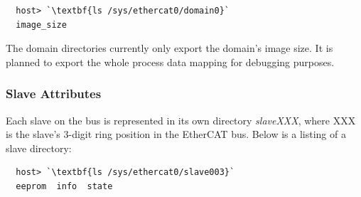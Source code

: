 \documentclass[a4paper,12pt,BCOR6mm,bibtotoc,idxtotoc]{scrbook}
\begin{document}
\begin{lstlisting}
  host> `\textbf{ls /sys/ethercat0/domain0}`
  image_size
\end{lstlisting}

The domain directories currently only export the domain's image size.
It is planned to export the whole process data mapping for debugging
purposes.

\subsubsection{Slave Attributes}
\label{sec:sysfs-slave}

Each slave on the bus is represented in its own directory
\textit{slaveXXX}, where XXX is the slave's 3-digit ring position in
the EtherCAT bus. Below is a listing of a slave directory:

\begin{lstlisting}
  host> `\textbf{ls /sys/ethercat0/slave003}`
  eeprom  info  state
\end{lstlisting}
\end{document}
